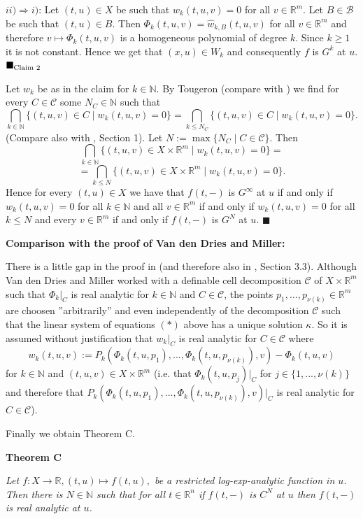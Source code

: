 \documentclass[12pt]{article}
\def\vs{\vspace}
\def\IN{\mathbb N}
\def\IR{\mathbb R}
\def\ma{\mathcal}
\begin{document}
\vs{0.2cm}
$ii) \Rightarrow i)$: Let $(t,u)\in X$ be such that $w_k(t,u,v)=0$ for all $v \in \IR^m$. Let $B \in \mathcal{B}$ be such that $(t,u) \in B$. Then
$\Phi_k(t,u,v)=\hat{w}_{k,B}(t,u,v)$ for all $v \in \IR^m$ and therefore
$v\mapsto \Phi_k(t,u,v)$ is a homogeneous polynomial of degree $k$. Since $k \geq 1$ it is not constant.
Hence we get that $(x,u)\in W_k$ and consequently $f$ is $G^k$ at $u$.
\hfill$\blacksquare_{\textnormal{Claim }2}$

\vs{0.4cm}
Let $w_k$ be as in the claim for $k \in \mathbb{N}$. By Tougeron (compare with \cite{12}) we find for every $C \in \ma{C}$ some $N_C\in \IN$ such that 
$$\bigcap_{k\in \IN}\{(t,u,v) \in C \mid w_k(t,u,v)=0\}=\bigcap_{k \leq N_C}\{(t,u,v) \in C \mid w_k(t,u,v)=0\}.$$
(Compare also with \cite{5}, 
Section 1). Let $N:=\max\{N_C\mid C \in \ma{C}\}$. Then 
$$\bigcap_{k\in \IN}\{(t,u,v) \in X \times \mathbb{R}^m \mid w_k(t,u,v)=0\} =$$
$$= \bigcap_{k \leq N}\{(t,u,v) \in X \times \mathbb{R}^m \mid w_k(t,u,v)=0\}.$$
Hence for every $(t,u)\in X$ we have that $f(t,-)$ is $G^\infty$ at $u$ if and only if $w_k(t,u,v)=0$ for all $k\in \IN$ and all $v \in \IR^m$ if and only if $w_k(t,u,v)=0$ for all $k \leq N$ and every $v\in \IR^m$
if and only if $f(t,-)$ is $G^N$ at $u$.
\hfill$\blacksquare$

\vs{0.5cm}
\textbf{Comparison with the proof of Van den Dries and Miller:}

\vs{0.1cm}
There is a little gap in the proof in \cite{5} (and therefore also in \cite{7}, Section 3.3). Although Van den Dries and Miller worked with a definable cell decomposition $\mathcal{C}$ of $X \times \mathbb{R}^m$ such that $\Phi_k|_C$ is real analytic for $k \in \mathbb{N}$ and $C \in \mathcal{C}$, the points $p_1,...,p_{\nu(k)} \in \mathbb{R}^m$ are choosen ''arbitrarily'' and even independently of the decomposition $\mathcal{C}$ such that the linear system of equations $(*)$ above has a unique solution $\kappa$. So it is assumed without justification that $w_k|_C$ is real analytic for $C \in \mathcal{C}$ where
$$w_k(t,u,v):=P_k(\Phi_k(t,u,p_1),...,\Phi_k(t,u,p_{\nu(k)}),v)-\Phi_k(t,u,v)$$
for $k \in \mathbb{N}$ and $(t,u,v) \in X \times \mathbb{R}^m$ (i.e. that $\Phi_k(t,u,p_j)|_C$ for $j \in \{1,...,\nu(k)\}$ and therefore that $P_k(\Phi_k(t,u,p_1),...,\Phi_k(t,u,p_{\nu(k)}),v)|_C$ is real analytic for $C \in \mathcal{C}$).

\newpage
Finally we obtain Theorem C.

\vs{0.5cm}
{\bf Theorem C} 

\vs{0.1cm}
{\it Let $f:X \to \mathbb{R}, (t,u) \mapsto f(t,u),$ be a restricted log-exp-analytic function in $u$. Then there is $N \in \mathbb{N}$ such that for all $t \in \mathbb{R}^n$ if $f(t,-)$ is $C^N$ at $u$ then $f(t,-)$ is real analytic at $u$.} 
\end{document}
